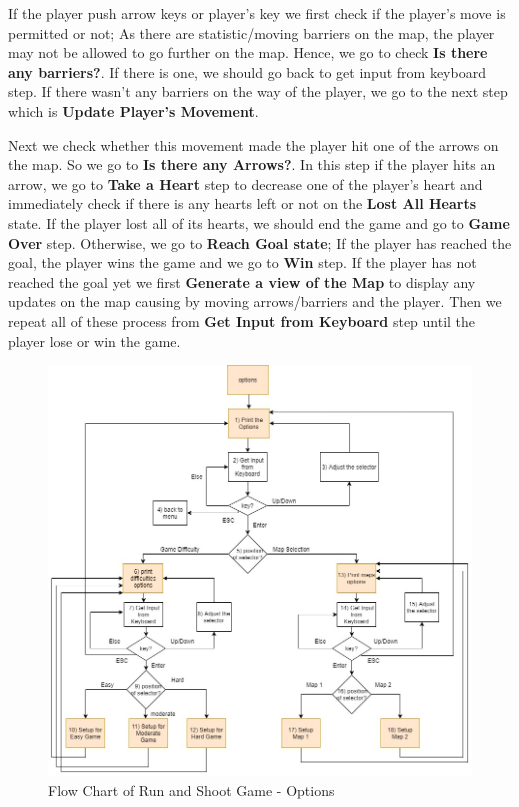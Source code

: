 If the player push arrow keys or player's key we first check if the player's move is permitted or not; As there are statistic/moving barriers on the map, the player may not be allowed to go further on the map. Hence, we go to check \textbf{Is there any barriers?}. If there is one, we should go back to get input from keyboard step. If there wasn't any barriers on the way of the player, we go to the next step which is \textbf{Update Player's Movement}.

Next we check whether this movement made the player hit one of the arrows on the map. So we go to \textbf{Is there any Arrows?}. In this step if the player hits an arrow, we go to \textbf{Take a Heart} step to decrease one of the player's heart and immediately check if there is any hearts left or not on the \textbf{Lost All Hearts} state. If the player lost all of its hearts, we should end the game and go to \textbf{Game Over} step. Otherwise, we go to \textbf{Reach Goal state}; If the player has reached the goal, the player wins the game and we go to \textbf{Win} step. If the player has not reached the goal yet we first \textbf{Generate a view of the Map} to display any updates on the map causing by moving arrows/barriers and the player. Then we repeat all of these process from \textbf{Get Input from Keyboard} step until the player lose or win the game.

\begin{figure} 
       
        \centering \includegraphics[width=\columnwidth]{Run_and_shoot-OPTIONS.jpg}
        \caption{
        Flow Chart of Run and Shoot Game - Options}
        \label{fig:options}
\end{figure}


